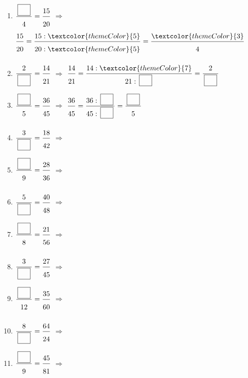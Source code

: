 \begin{enumerate}[leftmargin=*,align=parleft, label=\alph*), itemsep=9pt]
\item $\FA{\CaseC}{4}=\FA{15}{20}$ \quad $\Longrightarrow$ \quad $\FA{15}{20}=\FA{15 : \textcolor{themeColor}{5}}{20 : \textcolor{themeColor}{5}}=\FA{\textcolor{themeColor}{3}}{4}$
\item $\FA{2}{\CaseC}=\FA{14}{21}$ \quad $\Longrightarrow$ \quad $\FA{14}{21}=\FA{14 : \textcolor{themeColor}{7}}{21 : \CaseC}=\FA{2}{\CaseC}$
\item $\FA{\CaseC}{5}=\FA{36}{45}$ \quad $\Longrightarrow$ \quad $\FA{36}{45}=\FA{36 : \CaseC}{45 : \CaseC}=\FA{\CaseC}{5}$
\item $\FA{3}{\CaseC}=\FA{18}{42}$ \quad $\Longrightarrow$
\item $\FA{\CaseC}{9}=\FA{28}{36}$ \quad $\Longrightarrow$
\item $\FA{5}{\CaseC}=\FA{40}{48}$ \quad $\Longrightarrow$
\item $\FA{\CaseC}{8}=\FA{21}{56}$ \quad $\Longrightarrow$
\item $\FA{3}{\CaseC}=\FA{27}{45}$ \quad $\Longrightarrow$
\item $\FA{\CaseC}{12}=\FA{35}{60}$ \quad $\Longrightarrow$
\item $\FA{8}{\CaseC}=\FA{64}{24}$ \quad $\Longrightarrow$
\item $\FA{\CaseC}{9}=\FA{45}{81}$ \quad $\Longrightarrow$
\end{enumerate}
 
\newpage
{}
 

